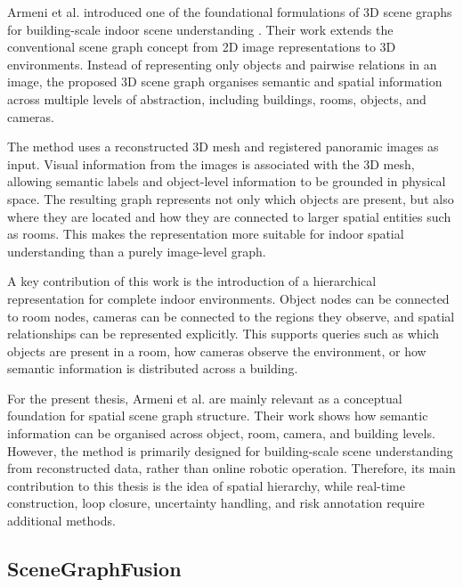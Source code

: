 {\small

Armeni et al. introduced one of the foundational formulations of 3D scene graphs for building-scale indoor scene understanding \cite{armeni2019threedscenegraph}. Their work extends the conventional scene graph concept from 2D image representations to 3D environments. Instead of representing only objects and pairwise relations in an image, the proposed 3D scene graph organises semantic and spatial information across multiple levels of abstraction, including buildings, rooms, objects, and cameras.

The method uses a reconstructed 3D mesh and registered panoramic images as input. Visual information from the images is associated with the 3D mesh, allowing semantic labels and object-level information to be grounded in physical space. The resulting graph represents not only which objects are present, but also where they are located and how they are connected to larger spatial entities such as rooms. This makes the representation more suitable for indoor spatial understanding than a purely image-level graph.

A key contribution of this work is the introduction of a hierarchical representation for complete indoor environments. Object nodes can be connected to room nodes, cameras can be connected to the regions they observe, and spatial relationships can be represented explicitly. This supports queries such as which objects are present in a room, how cameras observe the environment, or how semantic information is distributed across a building.

For the present thesis, Armeni et al. are mainly relevant as a conceptual foundation for spatial scene graph structure. Their work shows how semantic information can be organised across object, room, camera, and building levels. However, the method is primarily designed for building-scale scene understanding from reconstructed data, rather than online robotic operation. Therefore, its main contribution to this thesis is the idea of spatial hierarchy, while real-time construction, loop closure, uncertainty handling, and risk annotation require additional methods.

}

\subsection{SceneGraphFusion}

